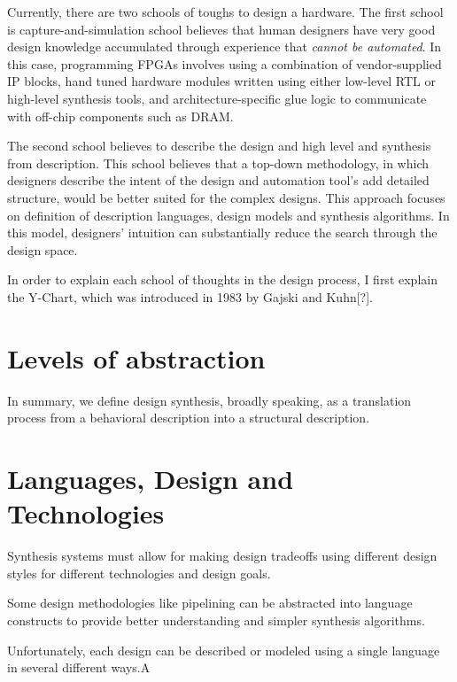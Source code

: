 Currently, there are two schools of toughs to design a hardware. The first school is capture-and-simulation school believes that human designers have very good design knowledge accumulated through experience that \emph{cannot be automated}. In this case, programming FPGAs involves using a combination of vendor-supplied IP blocks, hand tuned hardware modules written using either low-level RTL or high-level synthesis tools, and architecture-specific glue logic to communicate with off-chip components such as DRAM.

The second school believes to describe the design and high level and synthesis from description. This school believes that a top-down methodology, in which designers describe the intent of the design and automation tool's add detailed structure, would be better suited for the complex designs. This approach focuses on definition of description languages, design models and synthesis algorithms. In this model, designers' intuition can substantially reduce the search through the design space.


In order to explain each school of thoughts in the design process, I first explain the Y-Chart, which was introduced in 1983 by Gajski and Kuhn[?].


\section{Levels of abstraction}

In summary, we define design synthesis, broadly speaking, as a translation process from a behavioral description into a structural description.

\section{Languages, Design and Technologies}
Synthesis systems must allow for making design tradeoffs using different design styles for different technologies and design goals.

Some design methodologies like pipelining can be abstracted into language constructs to provide better understanding and simpler synthesis algorithms.

Unfortunately, each design can be described or modeled using a single language in several different ways.A

